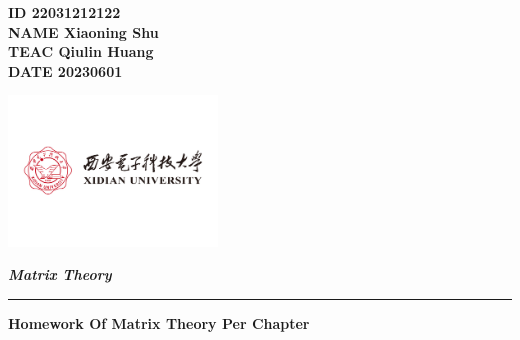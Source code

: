\documentclass[11pt,letterpaper]{ctexart}
\begin{document}
\pagestyle{plain}
\begin{flushleft}


\textbf{ID 22031212122} \\
\textbf{NAME Xiaoning Shu}\\
\textbf{TEAC Qiulin Huang}\\
\textbf{DATE 20230601}\\

\end{flushleft}

\begin{flushright}\vspace{-35mm}
\includegraphics[height=4.0cm]{logo.png}
\end{flushright}
 
\begin{center}\vspace{-0.1cm}
\textbf{ \large \textit{Matrix Theory}}\\
\end{center}

 
\rule{\linewidth}{0.6mm}

\bigskip

\begin{center}\vspace{-0.1cm}\textbf{ \large Homework Of Matrix Theory Per Chapter}\\
\end{center}


\bigskip
\end{document}
